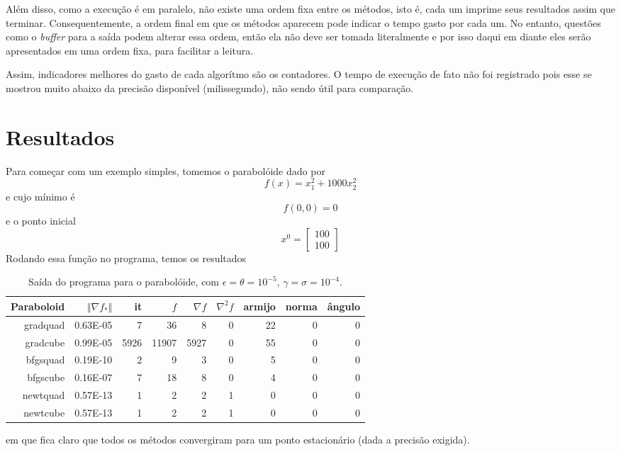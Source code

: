 \documentclass[a4paper,11pt]{article}
\begin{document}
            Além disso, como a execução é em paralelo, não existe uma ordem fixa entre os métodos, isto é, cada um imprime seus resultados assim que terminar. Consequentemente, a ordem final em que os métodos aparecem pode indicar o tempo gasto por cada um. No entanto, questões como o \emph{buffer} para a saída podem alterar essa ordem, então ela não deve ser tomada literalmente e por isso daqui em diante eles serão apresentados em uma ordem fixa, para facilitar a leitura.

            Assim, indicadores melhores do gasto de cada algorítmo são os contadores. O tempo de execução de fato não foi registrado pois esse se mostrou muito abaixo da precisão disponível (milissegundo), não sendo útil para comparação.

    \newpage
    \section*{Resultados}
        Para começar com um exemplo simples, tomemos o parabolóide dado por
            $$ f(x) = x_1^2 + 1000x_2^2 $$
        e cujo mínimo é
            $$ f(0, 0) = 0$$
        e o ponto inicial
            $$ x^0 = \begin{bmatrix}
                        100 \\
                        100
                     \end{bmatrix} $$
        Rodando essa função no programa, temos os resultados

        \begin{table}[h]
            \centering
            \begin{tabular}{r|rrrrrrrr}
                Paraboloid & $\Vert\nabla f_*\Vert$ & it & $f$ & $\nabla f $ & $\nabla^2f$ & armijo & norma & ângulo \\
                \hline
                gradquad & 0.63E-05  &       7  &      36   &      8    &     0    &    22    &     0    &     0 \\
                gradcube & 0.99E-05  &    5926  &   11907   &   5927    &     0    &    55    &     0    &     0 \\
                bfgsquad & 0.19E-10  &       2  &       9   &      3    &     0    &     5    &     0    &     0 \\
                bfgscube & 0.16E-07  &       7  &      18   &      8    &     0    &     4    &     0    &     0 \\
                newtquad & 0.57E-13  &       1  &       2   &      2    &     1    &     0    &     0    &     0 \\
                newtcube & 0.57E-13  &       1  &       2   &      2    &     1    &     0    &     0    &     0 \\
            \end{tabular}
            \caption{Saída do programa para o parabolóide, com $\epsilon = \theta = 10^{-5} $, $\gamma = \sigma = 10^{-4}$.}
        \end{table}
        em que fica claro que todos os métodos convergiram para um ponto estacionário (dada a precisão exigida).
\end{document}
